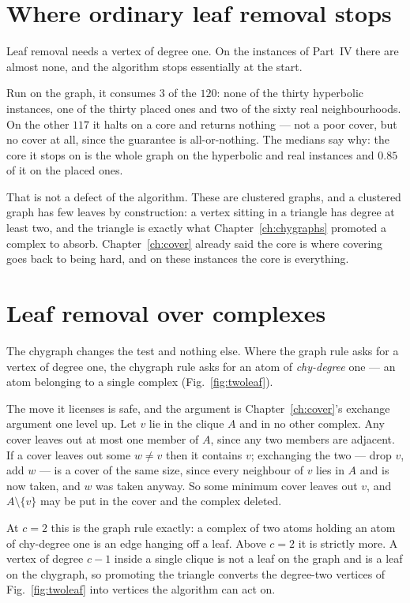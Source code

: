 \section{Where ordinary leaf removal stops}
\label{sec:ordinaryleaf}

Leaf removal needs a vertex of degree one. On the instances of Part~IV there
are almost none, and the algorithm stops essentially at the start.

Run on the graph, it consumes $3$ of the $120$: none of the thirty hyperbolic
instances, one of the thirty placed ones and two of the sixty real
neighbourhoods. On the other $117$ it halts on a core and returns nothing ---
not a poor cover, but no cover at all, since the guarantee is all-or-nothing.
The medians say why: the core it stops on is the whole graph on the hyperbolic
and real instances and $0.85$ of it on the placed ones.

That is not a defect of the algorithm. These are clustered graphs, and a
clustered graph has few leaves by construction: a vertex sitting in a triangle
has degree at least two, and the triangle is exactly what
Chapter~\ref{ch:chygraphs} promoted a complex to absorb. Chapter~\ref{ch:cover}
already said the core is where covering goes back to being hard, and on these
instances the core is everything.

\section{Leaf removal over complexes}
\label{sec:chyleaf}

The chygraph changes the test and nothing else. Where the graph rule asks for a
vertex of degree one, the chygraph rule asks for an atom of \emph{chy-degree}
one --- an atom belonging to a single complex (Fig.~\ref{fig:twoleaf}).

The move it licenses is safe, and the argument is Chapter~\ref{ch:cover}'s
exchange argument one level up. Let $v$ lie in the clique $A$ and in no other
complex. Any cover leaves out at most one member of $A$, since any two members
are adjacent. If a cover leaves out some $w\neq v$ then it contains $v$;
exchanging the two --- drop $v$, add $w$ --- is a cover of the same size, since
every neighbour of $v$ lies in $A$ and is now taken, and $w$ was taken anyway.
So some minimum cover leaves out $v$, and $A\setminus\{v\}$ may be put in the
cover and the complex deleted.

At $c=2$ this is the graph rule exactly: a complex of two atoms holding an atom
of chy-degree one is an edge hanging off a leaf. Above $c=2$ it is strictly
more. A vertex of degree $c-1$ inside a single clique is not a leaf on the
graph and is a leaf on the chygraph, so promoting the triangle converts the
degree-two vertices of Fig.~\ref{fig:twoleaf} into vertices the algorithm can
act on.

